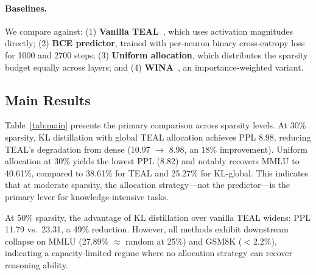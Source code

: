 \paragraph{Baselines.}
We compare against: (1) \textbf{Vanilla TEAL}~\cite{liu2025teal}, which uses activation magnitudes directly; (2) \textbf{BCE predictor}, trained with per-neuron binary cross-entropy loss for 1000 and 2700 steps; (3) \textbf{Uniform allocation}, which distributes the sparsity budget equally across layers; and (4) \textbf{WINA}~\cite{liu2025teal}, an importance-weighted variant.


\subsection{Main Results}

Table~\ref{tab:main} presents the primary comparison across sparsity levels.
At 30\% sparsity, KL distillation with global TEAL allocation achieves PPL 8.98, reducing TEAL's degradation from dense (10.97 $\to$ 8.98, an 18\% improvement). %
Uniform allocation at 30\% yields the lowest PPL (8.82) and notably recovers MMLU to 40.61\%, compared to 38.61\% for TEAL and 25.27\% for KL-global. %
This indicates that at moderate sparsity, the allocation strategy—not the predictor—is the primary lever for knowledge-intensive tasks.

At 50\% sparsity, the advantage of KL distillation over vanilla TEAL widens: PPL 11.79 vs.\ 23.31, a 49\% reduction. %
However, all methods exhibit downstream collapse on MMLU (27.89\% $\approx$ random at 25\%) and GSM8K ($<$2.2\%), indicating a capacity-limited regime where no allocation strategy can recover reasoning ability. %

